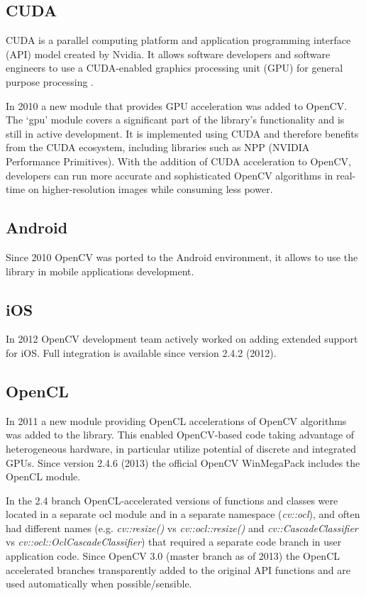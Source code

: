 \documentclass[9pt,twocolumn,twoside]{../../styles/osajnl}
\begin{document}
\subsection{CUDA}
CUDA is a parallel computing platform and application programming interface (API) model created by Nvidia. It allows software developers and software engineers to use a CUDA-enabled graphics processing unit (GPU) for general purpose processing \cite{www-cuda-wiki}. 

In 2010 a new module that provides GPU acceleration was added to OpenCV. The ‘gpu’ module covers a significant part of the library’s functionality and is still in active development. It is implemented using CUDA and therefore benefits from the CUDA ecosystem, including libraries such as NPP (NVIDIA Performance Primitives). With the addition of CUDA acceleration to OpenCV, developers can run more accurate and sophisticated OpenCV algorithms in real-time on higher-resolution images while consuming less power.

\subsection{Android}
Since 2010 OpenCV was ported to the Android environment, it allows to use the library in mobile applications development.
\subsection{iOS}
In 2012 OpenCV development team actively worked on adding extended support for iOS. Full integration is available since version 2.4.2 (2012).

\subsection{OpenCL}
In 2011 a new module providing OpenCL accelerations of OpenCV algorithms was added to the library. This enabled OpenCV-based code taking advantage of heterogeneous hardware, in particular utilize potential of discrete and integrated GPUs. Since version 2.4.6 (2013) the official OpenCV WinMegaPack includes the OpenCL module.

In the 2.4 branch OpenCL-accelerated versions of functions and classes were located in a separate ocl module and in a separate namespace (\textit{cv::ocl}), and often had different names (e.g. \textit{cv::resize()} vs \textit{cv::ocl::resize()} and \textit{cv::CascadeClassifier} vs \textit{cv::ocl::OclCascadeClassifier}) that required a separate code branch in user application code. Since OpenCV 3.0 (master branch as of 2013) the OpenCL accelerated branches transparently added to the original API functions and are used automatically when possible/sensible.
\end{document}
